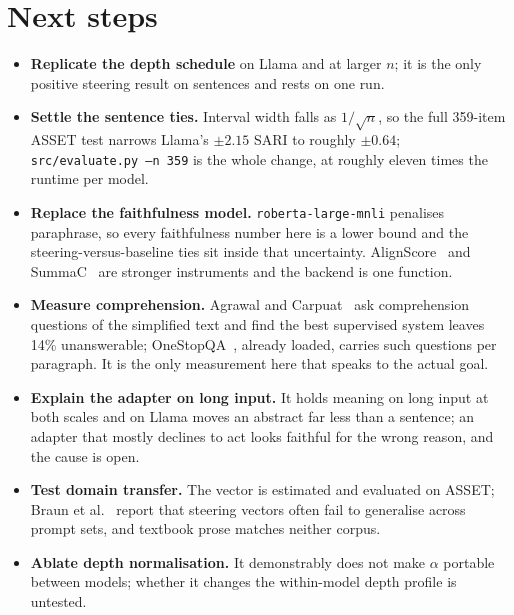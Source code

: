 \documentclass[aps,prb,reprint,nofootinbib,a4paper]{revtex4-2}
\newcommand{\code}[1]{\texttt{\small #1}}
\begin{document}
\section{Next steps}
\label{sec:next}

\begin{itemize}
\item \textbf{Replicate the depth schedule} on Llama and at larger $n$; it is
the only positive steering result on sentences and rests on one run.
\item \textbf{Settle the sentence ties.} Interval width falls as $1/\sqrt{n}$,
so the full 359-item ASSET test narrows Llama's $\pm 2.15$ SARI to roughly
$\pm 0.64$; \code{src/evaluate.py --n 359} is the whole change, at roughly
eleven times the runtime per model.
\item \textbf{Replace the faithfulness model.} \code{roberta-large-mnli}
penalises paraphrase, so every faithfulness number here is a lower bound and
the steering-versus-baseline ties sit inside that uncertainty.
AlignScore~\cite{alignscore} and SummaC~\cite{summac} are stronger instruments
and the backend is one function.
\item \textbf{Measure comprehension.} Agrawal and Carpuat~\cite{agrawal2024}
ask comprehension questions of the simplified text and find the best supervised
system leaves 14\% unanswerable; OneStopQA~\cite{onestop}, already loaded,
carries such questions per paragraph. It is the only measurement here that
speaks to the actual goal.
\item \textbf{Explain the adapter on long input.} It holds meaning on long
input at both scales and on Llama moves an abstract far less than a sentence;
an adapter that mostly declines to act looks faithful for the wrong reason, and
the cause is open.
\item \textbf{Test domain transfer.} The vector is estimated and evaluated on
ASSET; Braun et al.~\cite{braun2025} report that steering vectors often fail
to generalise across prompt sets, and textbook prose matches neither corpus.
\item \textbf{Ablate depth normalisation.} It demonstrably does not make
$\alpha$ portable between models; whether it changes the within-model depth
profile is untested.
\end{itemize}
\end{document}
